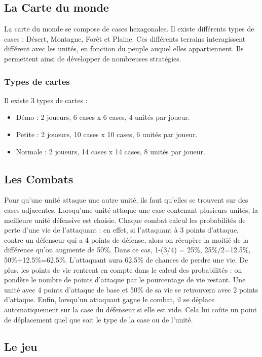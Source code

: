 \documentclass[12pt]{article}
\begin{document}
\subsection{La Carte du monde}
La carte du monde se compose de cases hexagonales. Il existe différents types de cases : Désert, Montagne, Forêt et Plaine. Ces différents terrains interagissent différent avec les unités, en fonction du peuple auquel elles appartiennent. Ils permettent ainsi de développer de nombreuses stratégies.

\subsubsection{Types de cartes}
Il existe 3 types de cartes :
\begin{itemize}
  \item Démo : 2 joueurs, 6 cases x 6 cases, 4 unités par joueur.
  \item Petite : 2 joueurs, 10 cases x 10 cases, 6 unités par joueur.
  \item Normale :  2 joueurs, 14 cases x 14 cases, 8 unités par joueur.
\end{itemize}

\subsection{Les Combats}
Pour qu'une unité attaque une autre unité, ils faut qu'elles se trouvent sur des cases adjacentes. Lorsqu'une unité attaque une case contenant plusieurs unités, la meilleure unité défensive est choisie. Chaque combat calcul les probabilités de perte d'une vie de l'attaquant : en effet, si l'attaquant à 3 points d'attaque, contre un défenseur qui a 4 points de défense, alors on récupère la moitié de la différence qu'on augmente de 50\%. Dans ce cas, 1-(3/4) = 25\%, 25\%/2=12.5\%, 50\%+12.5\%=62.5\%. L'attaquant aura 62.5\% de chances de perdre une vie.\newline
De plus, les points de vie rentrent en compte dans le calcul des probabilités : on pondère le nombre de points d'attaque par le pourcentage de vie restant. Une unité avec 4 points d'attaque de base et 50\% de sa vie se retrouvera avec 2 points d'attaque.\newline
Enfin, lorsqu'un attaquant gagne le combat, il se déplace automatiquement sur la case du défenseur si elle est vide. Cela lui coûte un point de déplacement quel que soit le type de la case ou de l'unité.

\subsection{Le jeu}
\end{document}
